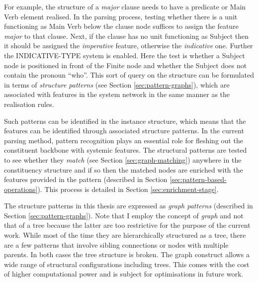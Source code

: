     For example, the structure of a \textit{major} clause needs to have a predicate or Main Verb element realised. In the parsing process, testing whether there is a unit functioning as Main Verb below the clause node suffices to assign the feature \textit{major} to that clause. Next, if the clause has no unit functioning as Subject then it should be assigned the \textit{imperative} feature, otherwise the \textit{indicative} one. Further the INDICATIVE-TYPE system is enabled. Here the test is whether a Subject node is positioned in front of the Finite node and whether the Subject does not contain the pronoun ``who''. This sort of query on the structure can be formulated in terms of \textit{structure patterns} (see Section \ref{sec:pattern-graphs}), which are associated with features in the system network in the same manner as the realisation rules. 
    
    Such patterns can be identified in the instance structure, which means that the features can be identified through associated structure patterns. In the current parsing method, pattern recognition plays an essential role for fleshing out the constituent backbone with systemic features. The structural patterns are tested to see whether they \textit{match} (see Section \ref{sec:graph-matching}) anywhere in the constituency structure and if so then the matched nodes are enriched with the features provided in the pattern (described in Section \ref{sec:pattern-based-operations}). This process is detailed in Section \ref{sec:enrichment-stage}. 

    The structure patterns in this thesis are expressed as \textit{graph patterns} (described in Section \ref{sec:pattern-graphs}). Note that I employ the concept of \textit{graph} and not that of a tree because the latter are too restrictive for the purpose of the current work. While most of the time they are hierarchically structured as a tree, there are a few patterns that involve sibling connections or nodes with multiple parents. In both cases the tree structure is broken. The graph construct allows a wide range of structural configurations including trees. This comes with the cost of higher computational power and is subject for optimisations in future work. 

    
